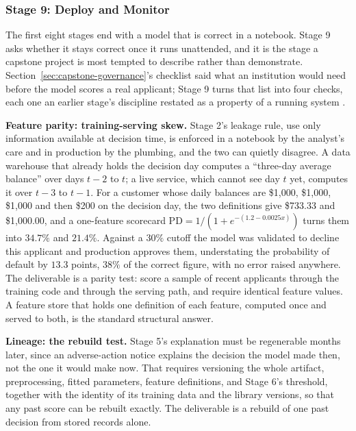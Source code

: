 \documentclass[../ai_in_finance]{subfiles}
\begin{document}
\subsubsection*{Stage 9: Deploy and Monitor}

The first eight stages end with a model that is correct in a notebook. Stage 9 asks whether it stays correct once it runs unattended, and it is the stage a capstone project is most tempted to describe rather than demonstrate. Section~\ref{sec:capstone-governance}'s checklist said what an institution would need before the model scores a real applicant; Stage 9 turns that list into four checks, each one an earlier stage's discipline restated as a property of a running system \parencite{sculley2015hidden}.

\textbf{Feature parity: training-serving skew.} Stage 2's leakage rule, use only information available at decision time, is enforced in a notebook by the analyst's care and in production by the plumbing, and the two can quietly disagree. A data warehouse that already holds the decision day computes a ``three-day average balance'' over days $t-2$ to $t$; a live service, which cannot see day $t$ yet, computes it over $t-3$ to $t-1$. For a customer whose daily balances are \$1{,}000, \$1{,}000, \$1{,}000 and then \$200 on the decision day, the two definitions give \$733.33 and \$1{,}000.00, and a one-feature scorecard $\text{PD} = 1/(1+e^{-(1.2-0.0025x)})$ turns them into $34.7\%$ and $21.4\%$. Against a $30\%$ cutoff the model was validated to decline this applicant and production approves them, understating the probability of default by $13.3$ points, $38\%$ of the correct figure, with no error raised anywhere. The deliverable is a parity test: score a sample of recent applicants through the training code and through the serving path, and require identical feature values. A feature store that holds one definition of each feature, computed once and served to both, is the standard structural answer.

\textbf{Lineage: the rebuild test.} Stage 5's explanation must be regenerable months later, since an adverse-action notice explains the decision the model made then, not the one it would make now. That requires versioning the whole artifact, preprocessing, fitted parameters, feature definitions, and Stage 6's threshold, together with the identity of its training data and the library versions, so that any past score can be rebuilt exactly. The deliverable is a rebuild of one past decision from stored records alone.
\end{document}
